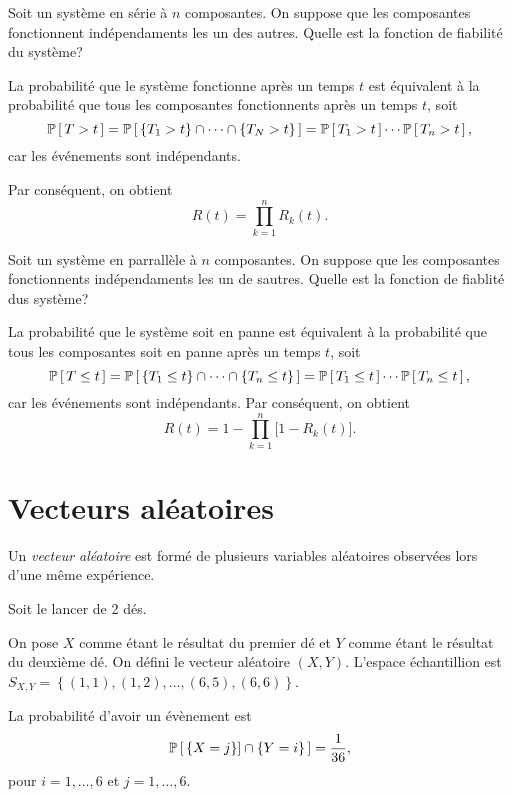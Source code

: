 \documentclass[11pt]{article}
\renewcommand\P[1]{%
	\ensuremath{%
		\mathbb{P}\left[\,#1\,\right]%
	}%
}%
\begin{document}
\begin{exemple}
	Soit un système en série à $n$ composantes. On suppose que les composantes
	fonctionnent indépendaments les un des autres. Quelle est la fonction de
	fiabilité du système?

	La probabilité que le système fonctionne après un temps $t$ est équivalent
	à la probabilité que tous les composantes fonctionnents après un temps $t$,
	soit
	\begin{equation*}
		\P{T>t}
		=\P{\left\{T_1>t\right\}\cap\cdots\cap\left\{T_N>t\right\}}
		=\P{T_1>t}\cdots\P{T_n>t},
	\end{equation*}
	car les événements sont indépendants. 
\end{exemple}
\addtocounter{exemple}{-1}
\begin{exemple}[suite]
	Par conséquent, on obtient
	\begin{equation*}
		R(t)=\prod_{k=1}^n R_k(t).
	\end{equation*}
\end{exemple}

\begin{exemple}
	Soit un système en parrallèle à $n$ composantes. On suppose que les
	composantes fonctionnents indépendaments les un de sautres. Quelle est la
	fonction de fiablité dus système?

	La probabilité que le système soit en panne est équivalent à la probabilité
	que tous les composantes soit en panne après un temps $t$, soit
	\begin{equation*}
		\P{T\leq t}
		=\P{\left\{T_1\leq t\right\}\cap\cdots\cap\left\{T_n\leq t\right\}}
		=\P{T_1\leq t}\cdots\P{T_n\leq t},
	\end{equation*}
	car les événements sont indépendants. Par conséquent, on obtient
	\begin{equation*}
		R(t)=1-\prod_{k=1}^n\bigg[1-R_k(t)\bigg].
	\end{equation*}
\end{exemple}

\section{Vecteurs aléatoires}
\begin{definition}
	Un \textit{vecteur aléatoire} est formé de plusieurs variables aléatoires
	observées lors d'une même expérience.
\end{definition}

\begin{exemple}
	Soit le lancer de 2 dés.

	On pose $X$ comme étant le résultat du premier dé et $Y$ comme étant le 
	résultat du deuxième dé. On défini le vecteur aléatoire $(X,Y)$. L'espace
	échantillion est $S_{X,Y}=\left\{(1,1),(1,2),\dots,(6,5),(6,6)\right\}$.

	La probabilité d'avoir un évènement est
	\begin{equation*}
		\P{\left\{X=j\right\}]\cap\left\{Y=i\right\}}=\frac{1}{36},
	\end{equation*}
	pour $i=1,\dots,6$ et $j=1,\dots,6$.
\end{exemple}
\end{document}
